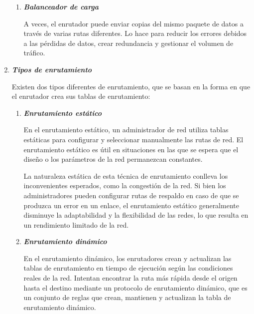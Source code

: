 \documentclass[12pt]{amsart}
\begin{document}
\begin{enumerate}
\begin{enumerate}
						\item \textbf{\textit{Balanceador de carga}}
						
						\medskip
						\noindent A veces, el enrutador puede enviar copias del mismo paquete de datos a través de varias rutas diferentes. Lo hace para reducir los errores debidos a las pérdidas de datos, crear redundancia y gestionar el volumen de tráfico. 		
						\bigskip\bigskip
			\end{enumerate}
		
		\bigskip\bigskip

		\item \textbf{\textit{Tipos de enrutamiento}}
		
		\medskip
		\noindent Existen dos tipos diferentes de enrutamiento, que se basan en la forma en que el enrutador crea sus tablas de enrutamiento:

			\begin{enumerate}
						\bigskip\bigskip

						\item \textbf{\textit{Enrutamiento estático}}
						
						\medskip
						\noindent En el enrutamiento estático, un administrador de red utiliza tablas estáticas para configurar y seleccionar manualmente las rutas de red. El enrutamiento estático es útil en situaciones en las que se espera que el diseño o los parámetros de la red permanezcan constantes.

La naturaleza estática de esta técnica de enrutamiento conlleva los inconvenientes esperados, como la congestión de la red. Si bien los administradores pueden configurar rutas de respaldo en caso de que se produzca un error en un enlace, el enrutamiento estático generalmente disminuye la adaptabilidad y la flexibilidad de las redes, lo que resulta en un rendimiento limitado de la red.		
						\bigskip\bigskip

						\item \textbf{\textit{Enrutamiento dinámico}}
						
						\medskip
						\noindent En el enrutamiento dinámico, los enrutadores crean y actualizan las tablas de enrutamiento en tiempo de ejecución según las condiciones reales de la red. Intentan encontrar la ruta más rápida desde el origen hasta el destino mediante un protocolo de enrutamiento dinámico, que es un conjunto de reglas que crean, mantienen y actualizan la tabla de enrutamiento dinámico.


\end{enumerate}
\end{enumerate}
\end{document}
